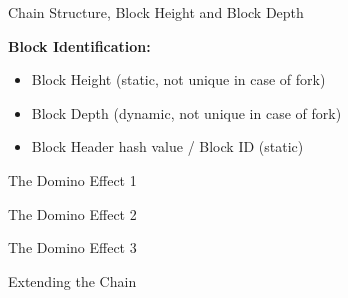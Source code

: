 \documentclass[]{beamer}
\begin{document}
\begin{frame}{Chain Structure, Block Height and Block Depth}
	\begin{figure}
		
	\end{figure}
\textbf{Block Identification:}
	\begin{itemize}
 		\item Block Height (static, not unique in case of fork)
 		\item Block Depth (dynamic, not unique in case of fork)
 		\item Block Header hash value / Block ID (static)
	\end{itemize}
\end{frame}


\begin{frame}{The Domino Effect 1}
	\begin{figure}
		
	\end{figure}
\end{frame}


\begin{frame}{The Domino Effect 2}
	\begin{figure}
		
	\end{figure}
\end{frame}


\begin{frame}{The Domino Effect 3}
	\begin{figure}
		
	\end{figure}
\end{frame}


\begin{frame}{Extending the Chain}
	\begin{figure}[h!]
	\center
		
	\end{figure}
\end{frame}

\end{document}
